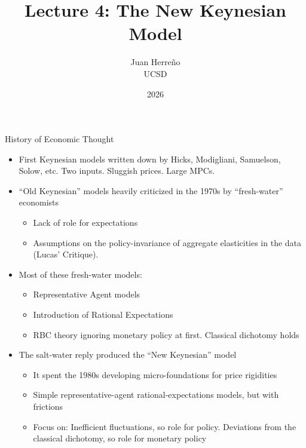 \documentclass[11pt,aspectratio=169,xcolor={dvipsnames},hyperref={pdftex,pdfpagemode=UseNone,hidelinks,pdfdisplaydoctitle=true},usepdftitle=false]{beamer}
\title{Lecture 4: The New Keynesian Model}
\author{Juan Herre\~{n}o\\UCSD}
\date{2026}
\begin{document}
\maketitle

\begin{frame}{History of Economic Thought}
\begin{itemize}
\item First Keynesian models written down by Hicks, Modigliani, Samuelson, Solow, etc. Two inputs. Sluggish prices. Large MPCs.
\pause
\item ``Old Keynesian'' models heavily criticized in the 1970s by ``fresh-water'' economists
\begin{itemize}
\item Lack of role for expectations
\item Assumptions on the policy-invariance of aggregate elasticities in the data (Lucas' Critique).
\end{itemize}
\pause
\item Most of these fresh-water models:
\begin{itemize}
\item Representative Agent models
\item Introduction of Rational Expectations
\item RBC theory ignoring monetary policy at first. Classical dichotomy holds
\end{itemize}
\pause
\item The salt-water reply produced the ``New Keynesian'' model
\begin{itemize}
\item It spent the 1980s developing micro-foundations for price rigidities
\item Simple representative-agent rational-expectations models, but with frictions
\item Focus on: Inefficient fluctuations, so role for policy. Deviations from the classical dichotomy, so role for monetary policy
\end{itemize}
\end{itemize}
\end{frame}
\end{document}
